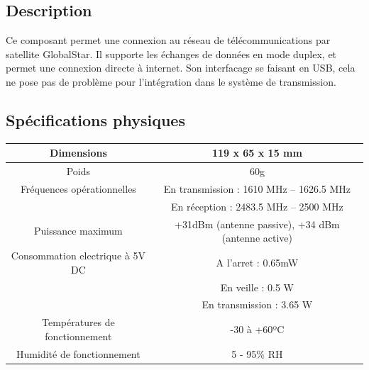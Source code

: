 \setcounter{subfigure}{0}
\begin{figure}[H]
\label{fig:satellite}
\end{figure}

\subsection{Description}

Ce composant permet une connexion au réseau de télécommunications par satellite GlobalStar. Il supporte les échanges de données en mode duplex, et permet une connexion directe à internet. Son interfacage se faisant en USB, cela ne pose pas de problème pour l'intégration dans le système de transmission.

\subsection{Spécifications physiques}

\begin{tabular}{|c|c|}
\hline Dimensions & 119 x 65 x 15 mm \\
\hline Poids & 60g \\
\hline Fréquences opérationnelles & 
En transmission : 1610 MHz – 1626.5 MHz \\
& En réception : 2483.5 MHz – 2500 MHz \\
\hline Puissance maximum & +31dBm (antenne passive), +34 dBm (antenne active) \\
\hline Consommation electrique à 5V DC & A l'arret : 0.65mW \\
& En veille : 0.5 W \\
& En transmission : 3.65 W \\ 
\hline Températures de fonctionnement & -30 à +60ºC \\
\hline Humidité de fonctionnement & 5 - 95\% RH \\
\hline
\end{tabular}